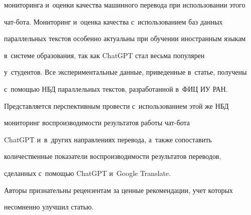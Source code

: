 мониторинга и~оцен\-ки качества машинного перевода при использовании этого 


чат-бо\-та. Мониторинг и~оценка качества с~использованием баз данных 


параллельных текс\-тов особенно актуальны при обуче\-нии иностранным языкам 


в~сис\-те\-ме образования, так как \mbox{ChatGPT} стал весьма популярен 


у~студентов. Все экспериментальные данные, приведенные в~\mbox{статье}, получены 


с~по\-мощью НБД параллельных текс\-тов, разработанной в~ФИЦ ИУ РАН.


   


   Представляется перспективным провести с~использованием этой же НБД 


мониторинг вос\-про\-из\-во\-ди\-мости результатов работы чат-бо\-та 


\mbox{ChatGPT} и~в~других на\-прав\-ле\-ни\-ях перевода, а~так\-же со\-по\-ста\-вить 


количественные показатели вос\-про\-из\-во\-ди\-мости результатов переводов, 


сделанных с~по\-мощью \mbox{ChatGPT} и~\mbox{Google} \mbox{Translate}.


   


   \bigskip


   




   Авторы признательны рецензентам за ценные рекомендации, учет которых 


несомненно улуч\-шил статью.





